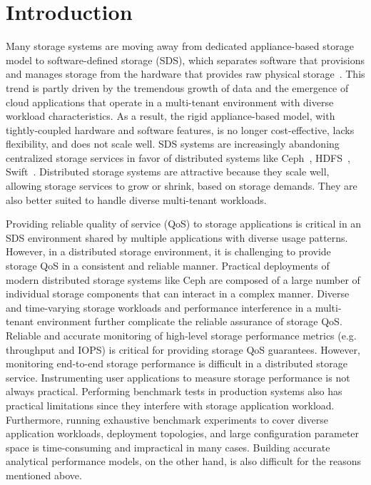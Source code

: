 \section{Introduction}
\label{ch4:sec:introduction}

Many storage systems are moving away from dedicated appliance-based storage model to software-defined 
storage (SDS), which separates software that provisions and manages storage from the hardware that provides raw physical storage~\cite{sds_att, Thereska2013, Jalaparti2012}.
This trend is partly driven by the tremendous growth of data and the emergence of cloud applications that operate in a multi-tenant environment with diverse workload characteristics.
As a result, the rigid appliance-based model, with tightly-coupled hardware and software features, is no longer cost-effective, lacks flexibility, and does not scale well.
SDS systems are increasingly abandoning centralized storage services in favor of distributed systems like Ceph~\cite{ceph}, HDFS~\cite{hadoop}, Swift~\cite{openstack}. 
Distributed storage systems are attractive because they scale well, allowing storage services to grow or shrink, based on storage demands. 
They are also better suited to handle diverse multi-tenant workloads. 

Providing reliable quality of service (QoS) to storage applications is critical in an SDS environment shared by multiple applications 
with diverse usage patterns. However, in a distributed storage environment, it is challenging to provide storage QoS in a consistent 
and reliable manner. Practical deployments of modern distributed storage systems like Ceph are composed of a large number of 
individual storage components that can interact in a complex manner. 
Diverse and time-varying storage workloads and performance interference in a multi-tenant environment further 
complicate the reliable assurance of storage QoS. Reliable and accurate monitoring of 
high-level storage performance metrics (e.g. throughput and IOPS) is critical 
for providing storage QoS guarantees.    
However, monitoring end-to-end storage performance is difficult in a distributed storage service. 
Instrumenting user applications to measure storage performance is not always practical. 
Performing benchmark tests in production systems also has practical limitations since they 
interfere with storage application workload.
Furthermore, running exhaustive benchmark experiments to cover diverse application workloads, 
deployment topologies, and large configuration parameter space is time-consuming and impractical in many cases. 
Building accurate analytical performance models, on the other hand, is also difficult for the reasons mentioned above.
 
